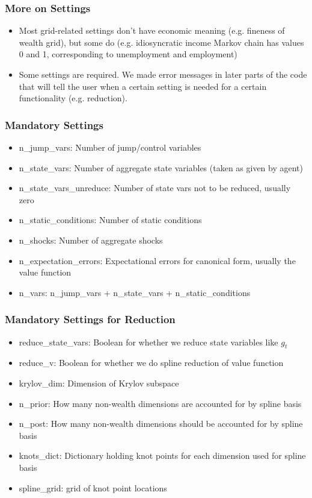 \documentclass{beamer}
\begin{document}
\begin{frame}
\frametitle{More on Settings}
\begin{itemize}
  \item Most grid-related settings don't have economic meaning (e.g. fineness of wealth grid), but some do (e.g. idiosyncratic income Markov chain has values 0 and 1, corresponding to unemployment and employment)
  \item Some settings are required. We made error messages in later parts of the code that will tell the user when a certain setting is needed for a certain functionality (e.g. reduction).
\end{itemize}
\end{frame}
\begin{frame}
\frametitle{Mandatory Settings}
\begin{itemize}
\item n\_jump\_vars: Number of jump/control variables
\item n\_state\_vars: Number of aggregate state variables (taken as given by agent)
\item n\_state\_vars\_unreduce: Number of state vars not to be reduced, usually zero
\item n\_static\_conditions: Number of static conditions
\item n\_shocks: Number of aggregate shocks
\item n\_expectation\_errors: Expectational errors for canonical form, usually the value function
\item n\_vars: n\_jump\_vars + n\_state\_vars + n\_static\_conditions
\end{itemize}
\end{frame}
\begin{frame}
\frametitle{Mandatory Settings for Reduction}
\begin{itemize}
\item reduce\_state\_vars: Boolean for whether we reduce state variables like $g_t$
\item reduce\_v: Boolean for whether we do spline reduction of value function
\item krylov\_dim: Dimension of Krylov subspace
\item n\_prior: How many non-wealth dimensions are accounted for by spline basis
\item n\_post: How many non-wealth dimensions should be accounted for by spline basis
\item knots\_dict: Dictionary holding knot points for each dimension used for spline basis
\item spline\_grid: grid of knot point locations
\end{itemize}
\end{frame}
\end{document}
